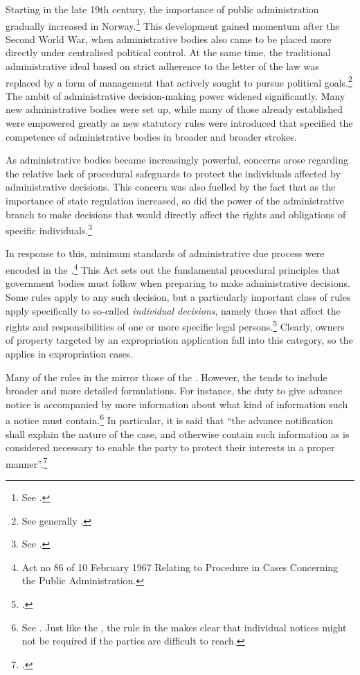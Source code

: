 Starting in the late 19th century, the importance of public administration gradually increased in Norway.\footnote{See \cite[8-12]{nut58}.} This development gained momentum after the Second World War, when administrative bodies also came to be placed more directly under centralised political control. At the same time, the traditional administrative ideal based on strict adherence to the letter of the law was replaced by a form of management that actively sought to pursue political goals.\footnote{See generally \cite{gronlie00}.} The ambit of administrative decision-making power widened significantly. Many new administrative bodies were set up, while many of those already established were empowered greatly as new statutory rules were introduced that specified the competence of administrative bodies in broader and broader strokes.

As administrative bodies became increasingly powerful, concerns arose regarding the relative lack of procedural safeguards to protect the individuals affected by administrative decisions. This concern was also fuelled by the fact that as the importance of state regulation increased, so did the power of the administrative branch to make decisions that would directly affect the rights and obligations of specific individuals.\footnote{See \cite[12-16]{nut58}.}

In response to this, minimum standards of administrative due process were encoded in the \cite{paa67}.\footnote{Act no 86 of 10 February 1967 Relating to Procedure in Cases Concerning the Public Administration.} This Act sets out the fundamental procedural principles that government bodies must follow when preparing to make administrative decisions. Some rules apply to any such decision, but a particularly important class of rules apply specifically to so-called {\it individual decisions}, namely those that affect the rights and responsibilities of one or more specific legal persons.\footcite[2]{paa67} Clearly, owners of property targeted by an expropriation application fall into this category, so the \cite{paa67} applies in expropriation cases.

Many of the rules in the \cite{paa67} mirror those of the \cite{ea59}. However, the \cite{paa67} tends to include broader and more detailed formulations. For instance, the duty to give advance notice is accompanied by more information about what kind of information such a notice must contain.\footnote{See \cite[16]{paa67}. Just like the \cite{ea59}, the rule in the \cite{paa67} makes clear that individual notices might not be required if the parties are difficult to reach.} In particular, it is said that ``the advance notification shall explain the nature of the case, and otherwise contain such information as is considered necessary to enable the party to protect their interests in a proper manner''.\footcite[16]{paa67} 

